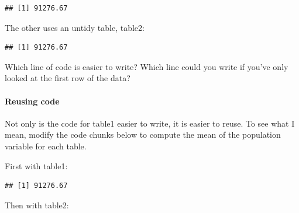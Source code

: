 \documentclass[
]{article}
\newenvironment{Shaded}{\begin{snugshade}}{\end{snugshade}}
\newcommand{\DecValTok}[1]{\textcolor[rgb]{0.00,0.00,0.81}{#1}}
\newcommand{\FunctionTok}[1]{\textcolor[rgb]{0.00,0.00,0.00}{#1}}
\newcommand{\NormalTok}[1]{#1}
\newcommand{\SpecialCharTok}[1]{\textcolor[rgb]{0.00,0.00,0.00}{#1}}
\begin{document}
\begin{verbatim}
## [1] 91276.67
\end{verbatim}

The other uses an untidy table, table2:

\begin{Shaded}
\end{Shaded}

\begin{verbatim}
## [1] 91276.67
\end{verbatim}

Which line of code is easier to write? Which line could you write if
you've only looked at the first row of the data?

\hypertarget{reusing-code}{%
\paragraph{Reusing code}\label{reusing-code}}

Not only is the code for table1 easier to write, it is easier to reuse.
To see what I mean, modify the code chunks below to compute the mean of
the population variable for each table.

First with table1:

\begin{Shaded}
\end{Shaded}

\begin{verbatim}
## [1] 91276.67
\end{verbatim}

Then with table2:

\begin{Shaded}
\end{Shaded}
\end{document}
